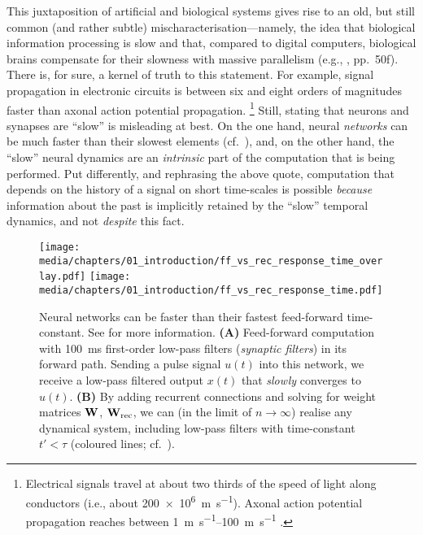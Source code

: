 This juxtaposition of artificial and biological systems gives rise to an old, but still common (and rather subtle) mis\-cha\-rac\-te\-ri\-sa\-tion---namely, the idea that biological information processing is slow and that, compared to digital computers, biological brains compensate for their slowness with massive parallelism (e.g., \cite{vonneumann1958computer}, pp.~50f).
There is, for sure, a kernel of truth to this statement.
For example, signal propagation in electronic circuits is between six and eight orders of magnitudes faster than axonal action potential propagation.%
\footnote{Electrical signals travel at about two thirds of the speed of light along conductors (i.e., about \SI{200e6}{\metre\per\second}). Axonal action potential propagation reaches between \SIrange{1}{100}{\metre\per\second} \citep[Chapter~2, p.~23]{kandel2012principles}.}
Still, stating that neurons and synapses are \enquote{slow} is misleading at best.
On the one hand, neural \emph{networks} can be much faster than their slowest elements (cf.~), and, on the other hand, the \enquote{slow} neural dynamics are an \emph{intrinsic} part of the computation that is being performed.
Put differently, and rephrasing the above  quote, computation that depends on the history of a signal on short time-scales is possible \emph{because} information about the past is implicitly retained by the \enquote{slow} temporal dynamics, and not \emph{despite} this fact.

\begin{figure}[p]
	\centering
	\texttt{[image: media/chapters/01\_introduction/ff\_vs\_rec\_response\_time\_overlay.pdf]}%
	\kern-158mm\texttt{[image: media/chapters/01\_introduction/ff\_vs\_rec\_response\_time.pdf]}
	\caption[Neural networks can be faster than their fastest time-constant]{Neural networks can be faster than their fastest feed-forward time-constant. See  for more information.
	\textbf{(A)} Feed-forward computation with \SI{100}{\milli\second} first-order low-pass filters (\emph{synaptic filters}) in its forward path. Sending a pulse signal $u(t)$ into this network, we receive a low-pass filtered output $x(t)$ that \emph{slowly} converges to $u(t)$.
	\textbf{(B)} By adding recurrent connections and solving for weight matrices $\mathbf{W}$, $\mathbf{W}_\mathrm{rec}$, we can (in the limit of $n \to \infty$) realise any dynamical system, including low-pass filters with time-constant $t' < \tau$ (coloured lines;  cf.~\cite[Chapter~8]{eliasmith2003neural}).
	}
	\label{fig:ff_vs_rec_response_time}
\end{figure}

